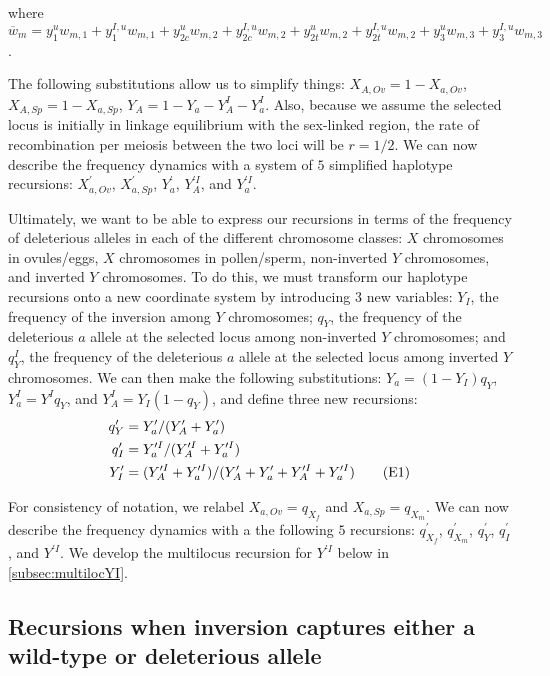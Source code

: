 \documentclass{article}
\newcommand\numberthis{\addtocounter{equation}{1}\tag{\theequation}}
\begin{document}
\begin{appendices}
\noindent where $\overline{w}_{m} = y^u_1 w_{m,1} + y^{I,u}_1 w_{m,1} + y^u_{2c} w_{m,2} + y^{I,u}_{2c} w_{m,2} + y^u_{2t} w_{m,2} + y^{I,u}_{2t} w_{m,2} + y^u_3 w_{m,3} + y^{I,u}_3 w_{m,3}$.

\bigskip

\noindent The following substitutions allow us to simplify things: $X_{A,Ov} = 1 - X_{a,Ov}$, $X_{A,Sp} = 1 - X_{a,Sp}$, $Y_{A} = 1 - Y_a - Y_A^I - Y_a^I$. Also, because we assume the selected locus is initially in linkage equilibrium with the sex-linked region, the rate of recombination per meiosis between the two loci will be $r = 1/2$. We can now describe the frequency dynamics with a system of $5$ simplified haplotype recursions: $X^{\prime}_{a,Ov}$, $X^{\prime}_{a,Sp}$, $Y^{\prime}_{a}$, $Y^{\prime I}_{A}$, and $Y^{\prime I}_{a}$.
\bigskip

Ultimately, we want to be able to express our recursions in terms of the frequency of deleterious alleles in each of the different chromosome classes: $X$ chromosomes in ovules/eggs, $X$ chromosomes in pollen/sperm, non-inverted $Y$ chromosomes, and inverted $Y$ chromosomes. To do this, we must transform our haplotype recursions onto a new coordinate system by introducing $3$ new variables: $Y_I$, the frequency of the inversion among $Y$ chromosomes; $q_Y$, the frequency of the deleterious $a$ allele at the selected locus among non-inverted $Y$ chromosomes; and $q^I_Y$, the frequency of the deleterious $a$ allele at the selected locus among inverted $Y$ chromosomes. We can then make the following substitutions: $Y_a = (1 - Y_I)q_Y$, $Y^I_a = Y^I q_Y$, and $Y^I_A = Y_I (1 - q_Y)$, and define three new recursions:
\begin{align*}
	q^{\prime}_Y &= Y^{\prime}_a / (Y^{\prime}_A + Y^{\prime}_a) \\
	q^{\prime}_I &= Y^{\prime I}_a / (Y^{\prime I}_A + Y^{\prime I}_a) \\
	Y^{\prime}_I &= (Y^{\prime I}_A + Y^{\prime I}_a) / (Y^{\prime}_A + Y^{\prime}_a + Y^{\prime I}_A + Y^{\prime I}_a)\numberthis
\end{align*}

\noindent For consistency of notation, we relabel $X_{a,Ov} = q_{X_f}$ and $X_{a,Sp} = q_{X_m}$. We can now describe the frequency dynamics with a the following $5$ recursions: $q^{\prime}_{X_f}$, $q^{\prime}_{X_m}$, $q^{\prime}_Y$, $q^{\prime}_I$, and $Y^{\prime I}$. We develop the multilocus recursion for $Y^{\prime I}$ below in \ref{subsec:multilocYI}.


\subsection{Recursions when inversion captures either a wild-type or deleterious allele}


\end{appendices}
\end{document}
